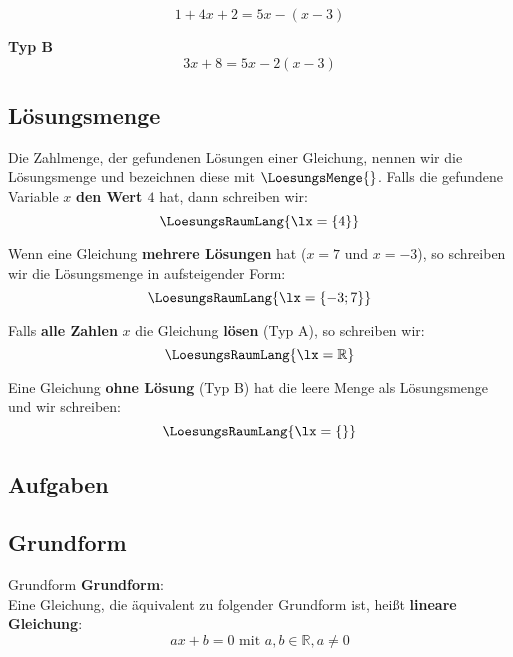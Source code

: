 $$1+4x+2 = 5x - (x-3)$$

\textbf{Typ B}\\

$$3x+8 = 5x-2(x-3)$$


\subsection{Lösungsmenge}
  Die Zahlmenge, der gefundenen Lösungen einer Gleichung, nennen wir
  die Lösungsmenge und bezeichnen diese mit $\LoesungsMenge{}$. Falls die gefundene
  Variable $x$ \zB{} \textbf{den Wert $4$} hat, dann schreiben wir:
  $$\LoesungsRaumLang{\lx=\{4\}}$$

  Wenn eine Gleichung \textbf{mehrere Lösungen} hat (\zB $x=7$ und $x=-3$), so
  schreiben wir die Lösungsmenge in aufsteigender Form:
  $$\LoesungsRaumLang{\lx=\{-3; 7\}}$$

  Falls \textbf{alle Zahlen} $x$ die Gleichung \textbf{lösen} (Typ A), so schreiben wir:
  $$\LoesungsRaumLang{\lx=\mathbb{R}}$$


  Eine Gleichung \textbf{ohne Lösung} (Typ B) hat die leere Menge als Lösungsmenge und
  wir schreiben:
  $$\LoesungsRaumLang{\lx=\{\}}$$

  

\subsection*{Aufgaben}


\newpage


\subsection{Grundform}
\begin{definition}{Grundform}{}
  \textbf{Grundform}:\\

  Eine Gleichung, die äquivalent zu folgender Grundform ist, heißt
  \textbf{lineare Gleichung}:\\
  $$ax+b=0 \text{ mit } a,b\in\mathbb{R}, a\ne 0$$
  
  \end{definition}

